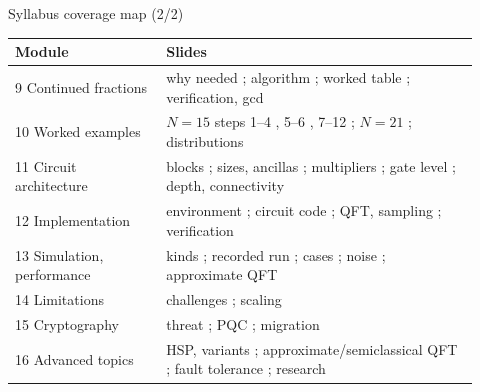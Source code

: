 \documentclass[aspectratio=169,11pt]{beamer}
\begin{document}
\begin{frame}{Syllabus coverage map (2/2)}
  \scriptsize
  \begin{tabular}{p{0.3\linewidth}p{0.62\linewidth}}
    \toprule \textbf{Module} & \textbf{Slides}\\ \midrule
    9 Continued fractions & why needed \pageref{fCFWhy}; algorithm \pageref{fCF}; worked table \pageref{fCFTable}; verification, gcd \pageref{fCFCode}\\
    10 Worked examples & $N = 15$ steps 1--4 \pageref{fEx15a}, 5--6 \pageref{fEx15b}, 7--12 \pageref{fEx15c}; $N = 21$ \pageref{fEx21}; distributions \pageref{fHist}\\
    11 Circuit architecture & blocks \pageref{fBlocks}; sizes, ancillas \pageref{fRegSize}; multipliers \pageref{fModMul}; gate level \pageref{fGateLevel}; depth, connectivity \pageref{fDepth}\\
    12 Implementation & environment \pageref{fEnv}; circuit code \pageref{fCode1}; QFT, sampling \pageref{fCode2}; verification \pageref{fVerify}\\
    13 Simulation, performance & kinds \pageref{fSimTypes}; recorded run \pageref{fRecorded}; cases \pageref{fCases}; noise \pageref{fNoise}; approximate QFT \pageref{fApprox}\\
    14 Limitations & challenges \pageref{fLimits}; scaling \pageref{fScaling}\\
    15 Cryptography & threat \pageref{fThreat}; PQC \pageref{fPQC}; migration \pageref{fMigration}\\
    16 Advanced topics & HSP, variants \pageref{fHSP}; approximate/semiclassical QFT \pageref{fSemiclassical}; fault tolerance \pageref{fFT}; research \pageref{fResearch}\\ \bottomrule
  \end{tabular}
\end{frame}
\end{document}
